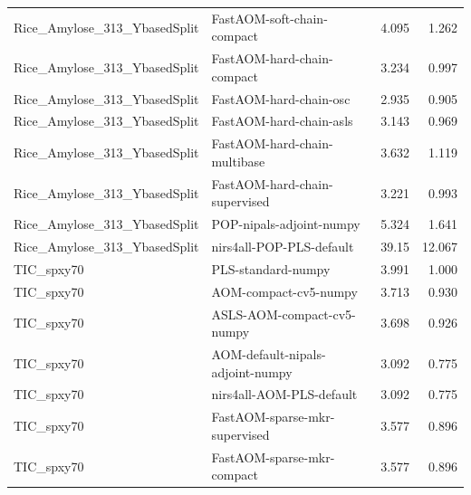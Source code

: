 \begin{landscape}
\begin{longtable}{L{8.0cm}L{9.5cm}rr}
Rice\_\allowbreak{}Amylose\_\allowbreak{}313\_\allowbreak{}YbasedSplit & FastAOM-\allowbreak{}soft-\allowbreak{}chain-\allowbreak{}compact & 4.095 & 1.262 \\
Rice\_\allowbreak{}Amylose\_\allowbreak{}313\_\allowbreak{}YbasedSplit & FastAOM-\allowbreak{}hard-\allowbreak{}chain-\allowbreak{}compact & 3.234 & 0.997 \\
Rice\_\allowbreak{}Amylose\_\allowbreak{}313\_\allowbreak{}YbasedSplit & FastAOM-\allowbreak{}hard-\allowbreak{}chain-\allowbreak{}osc & 2.935 & 0.905 \\
Rice\_\allowbreak{}Amylose\_\allowbreak{}313\_\allowbreak{}YbasedSplit & FastAOM-\allowbreak{}hard-\allowbreak{}chain-\allowbreak{}asls & 3.143 & 0.969 \\
Rice\_\allowbreak{}Amylose\_\allowbreak{}313\_\allowbreak{}YbasedSplit & FastAOM-\allowbreak{}hard-\allowbreak{}chain-\allowbreak{}multibase & 3.632 & 1.119 \\
Rice\_\allowbreak{}Amylose\_\allowbreak{}313\_\allowbreak{}YbasedSplit & FastAOM-\allowbreak{}hard-\allowbreak{}chain-\allowbreak{}supervised & 3.221 & 0.993 \\
Rice\_\allowbreak{}Amylose\_\allowbreak{}313\_\allowbreak{}YbasedSplit & POP-\allowbreak{}nipals-\allowbreak{}adjoint-\allowbreak{}numpy & 5.324 & 1.641 \\
Rice\_\allowbreak{}Amylose\_\allowbreak{}313\_\allowbreak{}YbasedSplit & nirs4all-\allowbreak{}POP-\allowbreak{}PLS-\allowbreak{}default & 39.15 & 12.067 \\
TIC\_\allowbreak{}spxy70 & PLS-\allowbreak{}standard-\allowbreak{}numpy & 3.991 & 1.000 \\
TIC\_\allowbreak{}spxy70 & AOM-\allowbreak{}compact-\allowbreak{}cv5-\allowbreak{}numpy & 3.713 & 0.930 \\
TIC\_\allowbreak{}spxy70 & ASLS-\allowbreak{}AOM-\allowbreak{}compact-\allowbreak{}cv5-\allowbreak{}numpy & 3.698 & 0.926 \\
TIC\_\allowbreak{}spxy70 & AOM-\allowbreak{}default-\allowbreak{}nipals-\allowbreak{}adjoint-\allowbreak{}numpy & 3.092 & 0.775 \\
TIC\_\allowbreak{}spxy70 & nirs4all-\allowbreak{}AOM-\allowbreak{}PLS-\allowbreak{}default & 3.092 & 0.775 \\
TIC\_\allowbreak{}spxy70 & FastAOM-\allowbreak{}sparse-\allowbreak{}mkr-\allowbreak{}supervised & 3.577 & 0.896 \\
TIC\_\allowbreak{}spxy70 & FastAOM-\allowbreak{}sparse-\allowbreak{}mkr-\allowbreak{}compact & 3.577 & 0.896 \\

\end{longtable}
\end{landscape}
